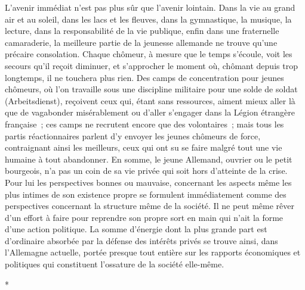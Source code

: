 \documentclass[french,twoside]{book} %
\begin{document}
L'avenir immédiat n'est pas plus sûr que l'avenir lointain. Dans la vie au grand air et au soleil, dans les lacs et les fleuves, dans la gymnastique, la musique, la lecture, dans la responsabilité de la vie publique, enfin dans une fraternelle camaraderie, la meilleure partie de la jeunesse allemande ne trouve qu'une précaire consolation. Chaque chômeur, à mesure que le temps s'écoule, voit les secours qu'il reçoit diminuer, et s'approcher le moment où, chômant depuis trop longtemps, il ne touchera plus rien. Des camps de concentration pour jeunes chômeurs, où l'on travaille sous une discipline militaire pour une solde de soldat (Arbeitsdienst), reçoivent ceux qui, étant sans ressources, aiment mieux aller là que de vagabonder misérablement ou d'aller s'engager dans la Légion étrangère française ; ces camps ne recrutent encore que des volontaires ; mais tous les partis réactionnaires parlent d'y envoyer les jeunes chômeurs de force, contraignant ainsi les meilleurs, ceux qui ont su se faire malgré tout une vie humaine à tout abandonner. En somme, le jeune Allemand, ouvrier ou le petit bourgeois, n'a pas un coin de sa vie privée qui soit hors d'atteinte de la crise. Pour lui les perspectives bonnes ou mauvaise, concernant les aspects même les plus intimes de son existence propre se formulent immédiatement comme des perspectives concernant la structure même de la société. Il ne peut même rêver d'un effort à faire pour reprendre son propre sort en main qui n'ait la forme d'une action politique. La somme d'énergie dont la plus grande part est d'ordinaire absorbée par la défense des intérêts privés se trouve ainsi, dans l'Allemagne actuelle, portée presque tout entière sur les rapports économiques et politiques qui constituent l'ossature de la société elle-même.\par

\begin{center}
\noindent \centerline{*}\par
\end{center}
\end{document}
